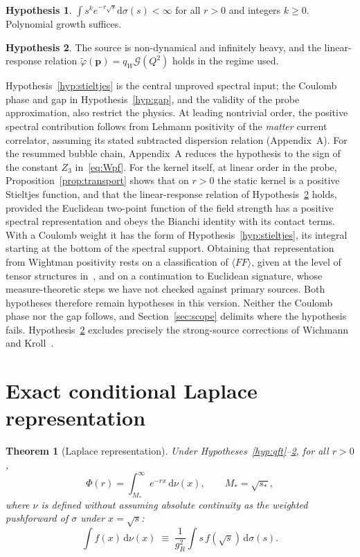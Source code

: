 \documentclass[11pt]{article}
\newtheorem{theorem}{Theorem}
\theoremstyle{definition}
\newtheorem{hypothesis}{Hypothesis}
\theoremstyle{remark}
\newcommand{\Mstar}{M_{*}}
\newcommand{\Gcal}{\mathcal{G}}
\newcommand{\dnu}{\mathrm{d}\nu}
\newcommand{\dsig}{\mathrm{d}\sigma}
\begin{document}
\begin{hypothesis}\label{hyp:growth}
$\int s^{k}e^{-r\sqrt{s}}\dsig(s)<\infty$ for all $r>0$ and integers $k\ge0$.
Polynomial growth suffices.
\end{hypothesis}

\begin{hypothesis}\label{hyp:probe}
The source is non-dynamical and infinitely heavy, and the linear-response
relation $\tilde\varphi(\mathbf{p})=q_{W}\Gcal(Q^{2})$ holds in the regime used.
\end{hypothesis}

Hypothesis~\ref{hyp:stieltjes} is the central unproved spectral input;
the Coulomb phase and gap in Hypothesis~\ref{hyp:gap}, and the validity of the
probe approximation, also restrict the physics. At leading nontrivial order,
the positive spectral contribution follows from Lehmann positivity of
the \emph{matter} current correlator, assuming its stated subtracted dispersion
relation (Appendix~A). For the resummed bubble chain, Appendix~A reduces the
hypothesis to the sign of the constant $Z_3$ in~\eqref{eq:Wpf}. For the
kernel itself, at linear order in the probe,
Proposition~\ref{prop:transport} shows that on $r>0$ the static kernel is a
positive Stieltjes function, and that the linear-response relation of
Hypothesis~\ref{hyp:probe} holds, provided the Euclidean two-point function of
the field strength has a positive spectral representation and obeys the
Bianchi identity with its contact terms. With a Coulomb weight it has the form
of Hypothesis~\ref{hyp:stieltjes}, its integral starting at the bottom of the
spectral support. Obtaining that representation from Wightman
positivity rests on a classification of $\langle FF\rangle$, given at the
level of tensor structures in~\cite{benedetti_casini_magan_2023}, and on a
continuation to Euclidean signature, whose measure-theoretic steps we have
not checked against primary sources. Both hypotheses therefore remain
hypotheses in this version. Neither the Coulomb
phase nor the gap follows, and Section~\ref{sec:scope} delimits where the
hypothesis fails. Hypothesis~\ref{hyp:probe}
excludes precisely the strong-source corrections of
Wichmann and Kroll~\cite{wichmann_kroll_1956}.

\section{Exact conditional Laplace representation}

\begin{theorem}[Laplace representation]\label{thm:A}
Under Hypotheses~\ref{hyp:qft}--\ref{hyp:probe}, for all $r>0$,
\begin{equation}
\Phi(r)=\int_{\Mstar}^{\infty}e^{-rx}\,\dnu(x),
\qquad \Mstar=\sqrt{s_{*}},
\label{eq:master}
\end{equation}
where $\nu$ is defined \emph{without assuming absolute continuity} as the
weighted pushforward of $\sigma$ under $x=\sqrt{s}$:
\begin{equation}
\int f(x)\,\dnu(x)\;\equiv\;\frac{1}{g_{R}^{2}}\int s\,f(\sqrt{s})\,\dsig(s).
\label{eq:pushforward}
\end{equation}
\end{theorem}
\end{document}
